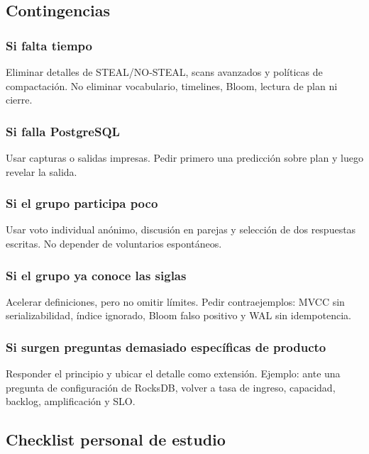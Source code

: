 \documentclass[variant=docente,cover=institutional,mode=screen]{ua-engineering-v6-article}
\begin{document}
\subsection{Contingencias}

\subsubsection*{Si falta tiempo}

Eliminar detalles de STEAL/NO-STEAL, scans avanzados y políticas de compactación. No eliminar vocabulario, timelines, Bloom, lectura de plan ni cierre.

\subsubsection*{Si falla PostgreSQL}

Usar capturas o salidas impresas. Pedir primero una predicción sobre plan y luego revelar la salida.

\subsubsection*{Si el grupo participa poco}

Usar voto individual anónimo, discusión en parejas y selección de dos respuestas escritas. No depender de voluntarios espontáneos.

\subsubsection*{Si el grupo ya conoce las siglas}

Acelerar definiciones, pero no omitir límites. Pedir contraejemplos: MVCC sin serializabilidad, índice ignorado, Bloom falso positivo y WAL sin idempotencia.

\subsubsection*{Si surgen preguntas demasiado específicas de producto}

Responder el principio y ubicar el detalle como extensión. Ejemplo: ante una pregunta de configuración de RocksDB, volver a tasa de ingreso, capacidad, backlog, amplificación y SLO.

\subsection{Checklist personal de estudio}
\end{document}
